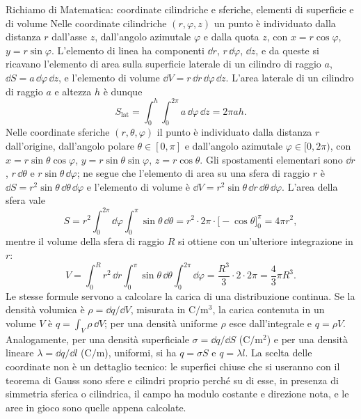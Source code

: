 \documentclass[11pt,a4paper]{article}
\begin{document}
\begin{riquadro}[label=ric:gauss:coordinate]{Richiamo di Matematica: coordinate cilindriche e sferiche, elementi di superficie e di volume}
Nelle coordinate cilindriche $(r,\varphi,z)$ un punto è individuato dalla distanza $r$ dall'asse $z$, dall'angolo azimutale $\varphi$ e dalla quota $z$, con $x=r\cos\varphi$, $y=r\sin\varphi$. L'elemento di linea ha componenti $\dd r$, $r\,\dd\varphi$, $\dd z$, e da queste si ricavano l'elemento di area sulla superficie laterale di un cilindro di raggio $a$, $\dd S=a\,\dd\varphi\,\dd z$, e l'elemento di volume $\dd V=r\,\dd r\,\dd\varphi\,\dd z$. L'area laterale di un cilindro di raggio $a$ e altezza $h$ è dunque
\[
S_{\mathrm{lat}}=\int_0^{h}\!\!\int_0^{2\pi} a\,\dd\varphi\,\dd z=2\pi a h .
\]
Nelle coordinate sferiche $(r,\theta,\varphi)$ il punto è individuato dalla distanza $r$ dall'origine, dall'angolo polare $\theta\in[0,\pi]$ e dall'angolo azimutale $\varphi\in[0,2\pi)$, con $x=r\sin\theta\cos\varphi$, $y=r\sin\theta\sin\varphi$, $z=r\cos\theta$. Gli spostamenti elementari sono $\dd r$, $r\,\dd\theta$ e $r\sin\theta\,\dd\varphi$; ne segue che l'elemento di area su una sfera di raggio $r$ è $\dd S=r^2\sin\theta\,\dd\theta\,\dd\varphi$ e l'elemento di volume è $\dd V=r^2\sin\theta\,\dd r\,\dd\theta\,\dd\varphi$. L'area della sfera vale
\[
S=r^2\int_0^{2\pi}\!\dd\varphi\int_0^{\pi}\sin\theta\,\dd\theta=r^2\cdot 2\pi\cdot\bigl[-\cos\theta\bigr]_0^{\pi}=4\pi r^2 ,
\]
mentre il volume della sfera di raggio $R$ si ottiene con un'ulteriore integrazione in $r$:
\[
V=\int_0^{R}r^2\,\dd r\int_0^{\pi}\sin\theta\,\dd\theta\int_0^{2\pi}\dd\varphi=\frac{R^3}{3}\cdot 2\cdot 2\pi=\frac{4}{3}\pi R^3 .
\]
Le stesse formule servono a calcolare la carica di una distribuzione continua. Se la densità volumica è $\rho=\dd q/\dd V$, misurata in $\mathrm{C/m^3}$, la carica contenuta in un volume $V$ è $q=\int_V\rho\,\dd V$; per una densità uniforme $\rho$ esce dall'integrale e $q=\rho V$. Analogamente, per una densità superficiale $\sigma=\dd q/\dd S$ ($\mathrm{C/m^2}$) e per una densità lineare $\lambda=\dd q/\dd l$ ($\mathrm{C/m}$), uniformi, si ha $q=\sigma S$ e $q=\lambda l$. La scelta delle coordinate non è un dettaglio tecnico: le superfici chiuse che si useranno con il teorema di Gauss sono sfere e cilindri proprio perché su di esse, in presenza di simmetria sferica o cilindrica, il campo ha modulo costante e direzione nota, e le aree in gioco sono quelle appena calcolate.
\end{riquadro}
\end{document}
